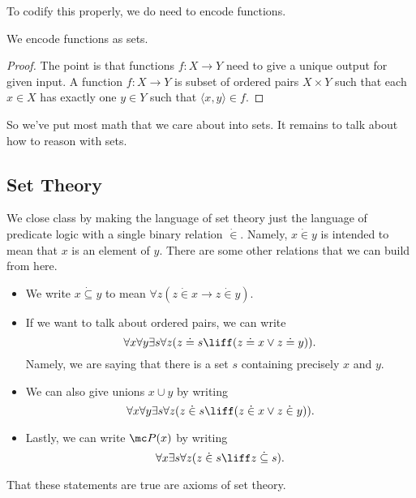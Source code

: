 To codify this properly, we do need to encode functions.
\begin{exe}
	We encode functions as sets.
\end{exe}
\begin{proof}
	The point is that functions $f\colon X\to Y$ need to give a unique output for given input. A function $f\colon X\to Y$ is subset of ordered pairs $X\times Y$ such that each $x\in X$ has exactly one $y\in Y$ such that $\langle x,y\rangle\in f$.
\end{proof}
So we've put most math that we care about into sets. It remains to talk about how to reason with sets.

\subsection{Set Theory}
We close class by making the language of set theory just the language of predicate logic with a single binary relation $\dot{{}\in{}}$. Namely, $x\dot{{}\in{}} y$ is intended to mean that $x$ is an element of $y$. There are some other relations that we can build from here.
\begin{itemize}
	\item We write $x\dot{{}\subseteq{}} y$ to mean $\forall z(z\dot{{}\in{}} x\to z\dot{{}\in{}} y)$.
	\item If we want to talk about ordered pairs, we can write
	\[\forall x\forall y\exists s\forall z(z\doteq s\liff(z\doteq x\lor z\doteq y)).\]
	Namely, we are saying that there is a set $s$ containing precisely $x$ and $y$.
	\item We can also give unions $x\cup y$ by writing
	\[\forall x\forall y\exists s\forall z(z\dot{{}\in{}} s\liff(z\dot{{}\in{}} x\lor z\dot{{}\in{}} y)).\]
	\item Lastly, we can write $\mc P(x)$ by writing
	\[\forall x\exists s\forall z(z\dot{{}\in{}} s\liff z\dot{{}\subseteq{}} s).\]
\end{itemize}
That these statements are true are axioms of set theory.